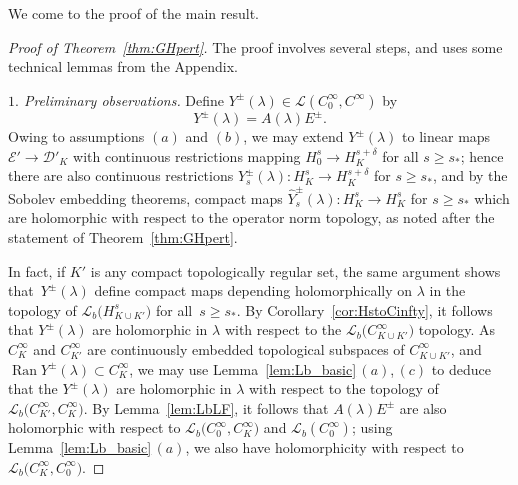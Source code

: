 \documentclass[11pt]{article}
\numberwithin{equation}{section}
\numberwithin{equation}{section}
\newcommand{\DD}{{\mathscr D}}
\newcommand{\EE}{{\mathscr E}}
\newcommand{\LL}{{\mathcal L}}
\newcommand{\Ran}{\operatorname{Ran}}
\begin{document}
 We come to the proof of the main result.
 \begin{proof}[Proof of Theorem~\ref{thm:GHpert}] The proof involves several steps, and uses some technical lemmas from the Appendix.
 	
 	\emph{$1.$ Preliminary observations.} Define $Y^\pm(\lambda)\in\LL(C_0^\infty,C^\infty)$ by
 	\begin{equation*}
 		Y^\pm(\lambda)=A(\lambda)E^\pm.
 	\end{equation*}
 	Owing to assumptions $(a)$ and $(b)$, we may extend $Y^\pm(\lambda)$ to linear maps $\EE'\to\DD'_K$ with continuous restrictions mapping $H^s_0\to H^{s+\delta}_K$ for all $s\ge s_*$; hence there are also continuous restrictions $Y_s^\pm(\lambda)\colon H^s_K\to H^{s+\delta}_K$ for $s\ge s_*$,
 	and by the Sobolev embedding theorems, compact maps $\hat{Y}^\pm_s(\lambda)\colon H^s_K\to H^{s}_K$ for $s\ge s_*$ which are holomorphic with respect to the operator norm topology, as noted after the statement of Theorem~\ref{thm:GHpert}.
 	
 	In fact, if $K'$ is any compact topologically regular set, the same argument shows that~$Y^\pm(\lambda)$
 define compact maps depending holomorphically on $\lambda$ in the topology of
 	$\LL_b\big(H^s_{K\cup K'}\big)$ for all~${s\!\ge\!s_*}$. By Corollary~\ref{cor:HstoCinfty}, it follows that
 	$Y^\pm(\lambda)$ are holomorphic in $\lambda$ with respect to the $\LL_b\big(C^\infty_{K\cup K'}\big)$ topology.
 	As $C^\infty_K$ and $C^\infty_{K'}$ are continuously embedded topological subspaces of $C^\infty_{K\cup K'}$, and $\Ran Y^\pm(\lambda)\subset C^\infty_K$, we may use Lemma~\ref{lem:Lb_basic}\,$(a)$,\,$(c)$ to deduce that
 	the $Y^\pm(\lambda)$ are holomorphic in $\lambda$ with respect to the
 	topology of $\LL_b\big(C^\infty_{K'},C^\infty_{K}\big)$.
 	By Lemma~\ref{lem:LbLF}, it follows that
 	$A(\lambda)E^\pm$ are also holomorphic with respect to $\LL_b\big(C_0^\infty,C^\infty_K\big)$ and $\LL_b(C_0^\infty)$; using Lemma~\ref{lem:Lb_basic}\,$(a)$, we also have holomorphicity with respect to
 	$\LL_b\big(C^\infty_K,C_0^\infty\big)$.
 	

\end{proof}
\end{document}
